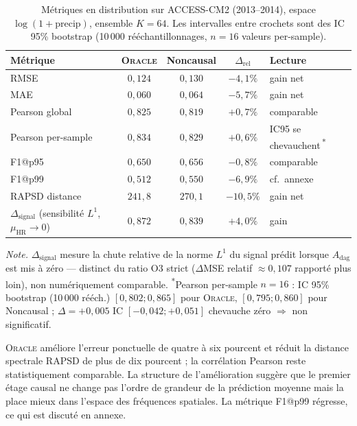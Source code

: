 \documentclass[14pt,a4paper,openany]{extreport}
\theoremstyle{definition}
\newcommand{\Oracle}{\textsc{Oracle}}
\newcommand{\HR}{\ensuremath{\text{HR}}}
\newcommand{\muHR}{\ensuremath{\mu_{\HR}}}
\newcommand{\Adag}{\ensuremath{A_{\mathrm{dag}}}}
\begin{document}
\begin{table}[ht]
  \centering
  \small
  \caption{Métriques en distribution sur ACCESS-CM2 (2013--2014), espace $\log(1 + \mathrm{precip})$, ensemble $K = 64$. Les intervalles entre crochets sont des IC 95\% bootstrap (10\,000 rééchantillonnages, $n=16$ valeurs per-sample).}
  \label{tab:exp-res-id}
  \begin{tabularx}{\linewidth}{l c c c X}
    \toprule
    \textbf{Métrique} & \Oracle{} & \textbf{Noncausal} & $\Delta_{\mathrm{rel}}$ & \textbf{Lecture} \\
    \midrule
    RMSE & $0{,}124$ & $0{,}130$ & $-4{,}1\%$ & gain net \\
    MAE & $0{,}060$ & $0{,}064$ & $-5{,}7\%$ & gain net \\
    Pearson global & $0{,}825$ & $0{,}819$ & $+0{,}7\%$ & comparable \\
    Pearson per-sample & $0{,}834$ & $0{,}829$ & $+0{,}6\%$ & IC95 se chevauchent\,\textsuperscript{*} \\
    F1@p95 & $0{,}650$ & $0{,}656$ & $-0{,}8\%$ & comparable \\
    F1@p99 & $0{,}512$ & $0{,}550$ & $-6{,}9\%$ & cf.~annexe \\
    RAPSD distance & $241{,}8$ & $270{,}1$ & $-10{,}5\%$ & gain net \\
    $\Delta_{\mathrm{signal}}$ (sensibilité $L^1$, $\muHR \to 0$) & $0{,}872$ & $0{,}839$ & $+4{,}0\%$ & gain \\
    \bottomrule
  \end{tabularx}
  \vspace{0.3em}
  \footnotesize
  \emph{Note.} $\Delta_{\mathrm{signal}}$ mesure la chute relative de la norme $L^1$ du signal prédit lorsque $\Adag$ est mis à zéro --- distinct du ratio O3 strict ($\Delta$MSE relatif $\approx 0{,}107$ rapporté plus loin), non numériquement comparable. \textsuperscript{*}Pearson per-sample $n=16$ : IC 95\% bootstrap (10\,000 rééch.) $[0{,}802; 0{,}865]$ pour \Oracle{}, $[0{,}795; 0{,}860]$ pour Noncausal ; $\Delta = +0{,}005$ IC $[-0{,}042; +0{,}051]$ chevauche zéro $\Rightarrow$ non significatif.
\end{table}

\Oracle{} améliore l'erreur ponctuelle de quatre à six pourcent et réduit la distance spectrale RAPSD de plus de dix pourcent ; la corrélation Pearson reste statistiquement comparable. La structure de l'amélioration suggère que le premier étage causal ne change pas l'ordre de grandeur de la prédiction moyenne mais la place mieux dans l'espace des fréquences spatiales. La métrique F1@p99 régresse, ce qui est discuté en annexe.
\end{document}
